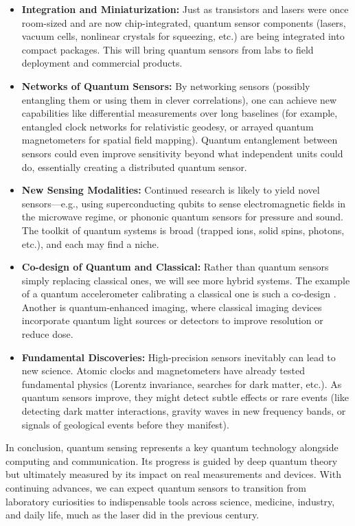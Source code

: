 \begin{itemize}

\item \textbf{Integration and Miniaturization:} Just as transistors and lasers were once room-sized and are now chip-integrated, quantum sensor components (lasers, vacuum cells, nonlinear crystals for squeezing, etc.) are being integrated into compact packages. This will bring quantum sensors from labs to field deployment and commercial products.

\item \textbf{Networks of Quantum Sensors:} By networking sensors (possibly entangling them or using them in clever correlations), one can achieve new capabilities like differential measurements over long baselines (for example, entangled clock networks for relativistic geodesy, or arrayed quantum magnetometers for spatial field mapping). Quantum entanglement between sensors could even improve sensitivity beyond what independent units could do, essentially creating a distributed quantum sensor.

\item \textbf{New Sensing Modalities:} Continued research is likely to yield novel sensors—e.g., using superconducting qubits to sense electromagnetic fields in the microwave regime, or phononic quantum sensors for pressure and sound. The toolkit of quantum systems is broad (trapped ions, solid spins, photons, etc.), and each may find a niche.

\item \textbf{Co-design of Quantum and Classical:} Rather than quantum sensors simply replacing classical ones, we will see more hybrid systems. The example of a quantum accelerometer calibrating a classical one is such a co-design . Another is quantum-enhanced imaging, where classical imaging devices incorporate quantum light sources or detectors to improve resolution or reduce dose.

\item \textbf{Fundamental Discoveries:} High-precision sensors inevitably can lead to new science. Atomic clocks and magnetometers have already tested fundamental physics (Lorentz invariance, searches for dark matter, etc.). As quantum sensors improve, they might detect subtle effects or rare events (like detecting dark matter interactions, gravity waves in new frequency bands, or signals of geological events before they manifest).

\end{itemize}



In conclusion, quantum sensing represents a key quantum technology
alongside computing and communication. Its progress is guided by deep
quantum theory but ultimately measured by its impact on real
measurements and devices. With continuing advances, we can expect
quantum sensors to transition from laboratory curiosities to
indispensable tools across science, medicine, industry, and daily
life, much as the laser did in the previous century.




